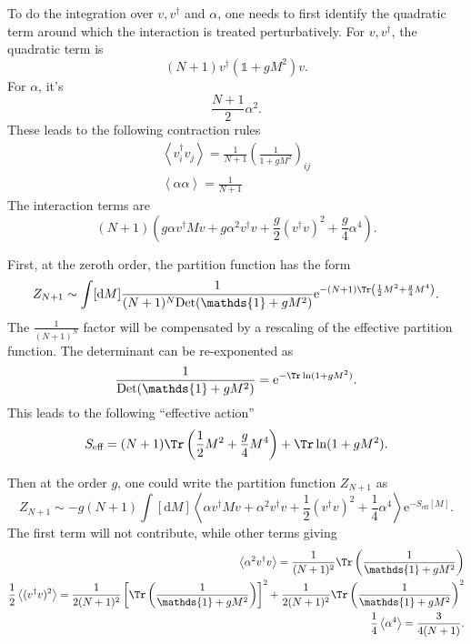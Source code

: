 
To do the integration over $v,v^\dagger$ and $\alpha$,
one needs to first identify the quadratic term
around which the interaction is treated perturbatively.
For $v,v^\dagger$, the quadratic term is
\[
	(N+1)	v^\dagger \left(\mathds{1} + g M^2\right) v
.\] 
For $\alpha$, it's
\[
\frac{N+1}{2} \alpha^2
.\] 
These leads to the following contraction rules
\begin{align*}
	\left<v_i^\dagger v_j \right> =\frac{1}{N+1} \left( \frac{1}{1 + g M^2} \right)_{ij} \\
	\left<\alpha \alpha \right> = \frac{1}{N+1}
\end{align*}
The interaction terms are
\[
	(N+1)\left( g \alpha v^\dagger M v + g \alpha^2 v^\dagger v 
+ \frac{g}{2} (v^\dagger v)^2 + \frac{g}{4} \alpha^4\right)
.\]

First, at the zeroth order,
the partition function has the form
\[
	Z_{N+1} \sim \int [\mathrm{d} M] \frac{1}{(N+1)^N \mathrm{Det} (\mathds{1} + g M^2)} \mathrm{e}^{- (N+1) \Tr \left( \frac{1}{2} M^2 + \frac{g}{4} M^4 \right) }
.\] 
The $\frac{1}{(N+1)^N}$ factor will be compensated by a rescaling of the effective partition function.
The determinant can be re-exponented as
\[
	\frac{1}{\mathrm{Det}(\mathds{1} + g M^2)} = \mathrm{e}^{- \Tr \ln (1 + g M^2)}
.\] 
This leads to the following ``effective action''
\begin{equation}
 S_{\text{eff}} = (N+1) \Tr \left( \frac{1}{2} M^2 + \frac{g}{4} M^4 \right) + \Tr \ln (1 + g M^2).	
\end{equation}

Then at the order $g$,
one could write the partition function $Z_{N+1}$ as
\[
	Z_{N+1} \sim -g (N+1)\int [\mathrm{d} M] \left<\alpha v^\dagger M v
	+ \alpha^2 v^\dagger v + \frac{1}{2} (v^\dagger v)^2
	+ \frac{1}{4} \alpha^4\right> \mathrm{e}^{- S_{\text{eff}}[M]}
.\] 
The first term will not contribute,
while other terms giving
\begin{align*}
	\left<\alpha^2 v^\dagger v \right> = \frac{1}{(N+1)^{2}}\Tr \left( \frac{1}{\mathds{1} + g M^2} \right) \\
	\frac{1}{2} \left<(v^\dagger v)^2 \right> = \frac{1}{2(N+1)^2} \left[ \Tr \left( \frac{1}{\mathds{1} + g M^2} \right)  \right]^2 + \frac{1}{2(N+1)^2} \Tr \left( \frac{1}{\mathds{1} + g M^2} \right)^2 \\
	\frac{1}{4} \left<\alpha^4 \right> = \frac{3}{4(N+1)}.
\end{align*}

